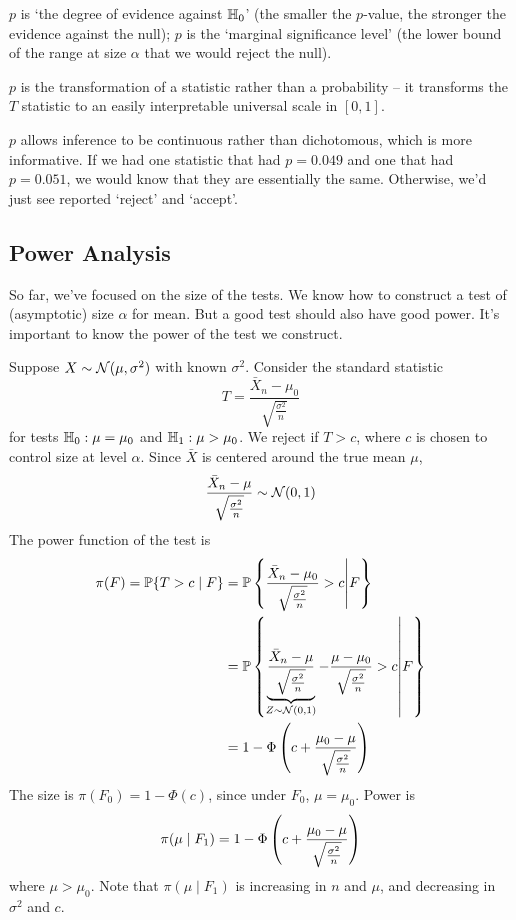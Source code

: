 \documentclass[10pt]{article}
\begin{document}
$p$ is `the degree of evidence against $\mathbb{H}_0$' (the smaller the $p$-value, the stronger the evidence against the null); $p$ is the `marginal significance level' (the lower bound of the range at size $\alpha$ that we would reject the null).

\begin{remark}
	$p$ is the transformation of a statistic rather than a probability -- it transforms the $T$ statistic to an easily interpretable universal scale in $[0,1]$. 
	
	$p$ allows inference to be continuous rather than dichotomous, which is more informative. If we had one statistic that had $p = 0.049$ and one that had $p = 0.051$, we would know that they are essentially the same. Otherwise, we'd just see reported `reject' and `accept'.
\end{remark}


\subsection{Power Analysis}

So far, we've focused on the size of the tests. We know how to construct a test of (asymptotic) size $\alpha$ for mean. But a good test should also have good power. It's important to know the power of the test we construct.

\begin{example}
	Suppose $X \sim \mathcal{N}(\mu,\sigma^2)$ with known $\sigma^2$. Consider the standard statistic
	\[
	T = \frac{\bar{X}_n - \mu_0}{\sqrt{\frac{\sigma^2}{n}}}
	\]
	for tests $\mathbb{H}_0 : \mu = \mu_0$ and $\mathbb{H}_1 : \mu > \mu_0$. We reject if $T > c$, where $c$ is chosen to control size at level $\alpha$. Since $\bar{X}$ is centered around the true mean $\mu$, 
	\[
	\frac{\bar{X}_n - \mu}{\sqrt{\frac{\sigma^2}{n}}} \sim \mathcal{N}(0,1)
	\]
	The power function of the test is
	\begin{align*}
		\pi(F) = \mathbb{P}\{T > c \mid F\} &= \mathbb{P} \left\{\frac{\bar{X}_n - \mu_0}{\sqrt{\frac{\sigma^2}{n}}} > c \middle| F \right\} \\
		&= \mathbb{P} \left\{ \underbrace{\frac{\bar{X}_n - \mu}{\sqrt{\frac{\sigma^2}{n}}}}_{Z \sim \mathcal{N}(0,1)} - \frac{\mu - \mu_0}{\sqrt{\frac{\sigma^2}{n}}} > c \middle| F\right\} \\
		&= 1 - \Phi \left( c + \frac{\mu_0 - \mu}{\sqrt{\frac{\sigma^2}{n}}}\right)
	\end{align*}
	The size is $\pi(F_0) = 1 - \Phi(c)$, since under $F_0$, $\mu = \mu_0$. Power is 
	\[
	\pi(\mu \mid F_1 ) = 1 - \Phi \left( c + \frac{\mu_0 - \mu}{\sqrt{\frac{\sigma^2}{n}}}\right)
	\]
	where $\mu > \mu_0$. Note that $\pi(\mu \mid F_1)$ is increasing in $n$ and $\mu$, and decreasing in $\sigma^2$ and $c$.
\end{example}
\end{document}

